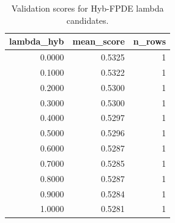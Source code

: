 \begin{table}[t]
\caption{Validation scores for Hyb-FPDE lambda candidates.}
\label{tab:lambda_distribution_computed}
\centering
\begin{tabular}{rrr}
\toprule
lambda\_hyb & mean\_score & n\_rows \\
\midrule
0.0000 & 0.5325 & 1 \\
0.1000 & 0.5322 & 1 \\
0.2000 & 0.5300 & 1 \\
0.3000 & 0.5300 & 1 \\
0.4000 & 0.5297 & 1 \\
0.5000 & 0.5296 & 1 \\
0.6000 & 0.5287 & 1 \\
0.7000 & 0.5285 & 1 \\
0.8000 & 0.5287 & 1 \\
0.9000 & 0.5284 & 1 \\
1.0000 & 0.5281 & 1 \\
\bottomrule
\end{tabular}

\end{table}
